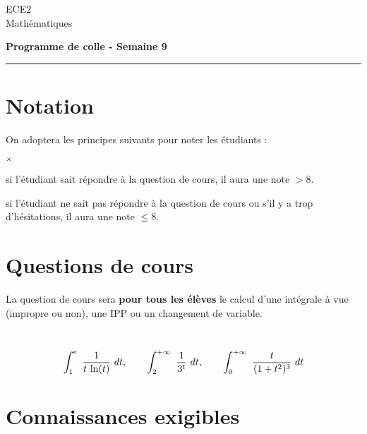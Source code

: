 \documentclass[11pt]{article}%
\begin{document}
\begin{flushleft}
ECE2 \\
Mathématiques
\end{flushleft}


\vspace{0.1cm}

\begin{center}
\textbf{\Large{Programme de colle - Semaine 9}}
\end{center}

\hrule

\vspace*{0,2cm}

\section*{Notation}

\noindent
On adoptera les principes suivants pour noter les étudiants :
\begin{noliste}{$\scriptstyle \times$}
\item si l'étudiant sait répondre à la question de cours, il 
aura une note $>8$.
\item si l'étudiant ne sait pas répondre à la question de 
cours ou s'il y a trop d'hésitations, il aura une note $\leq 8$.
\end{noliste}

\section*{Questions de cours}


\noindent
La question de cours sera {\bf pour tous les élèves} le calcul d'une 
intégrale à vue (impropre ou non), une IPP ou un changement de variable.

\begin{examples}~
 \[
  \displaystyle \int_{1}^{\text{e}}\  \dfrac{1}{t\, \ln(t)} \ dt, \qquad
  \displaystyle \int_{2}^{+\infty}\  \dfrac{1}{3^t} \ dt, \qquad
  \displaystyle \int_{0}^{+\infty}\  \dfrac{t}{(1+t^2)^3} \ dt
 \]
\end{examples}


\section*{Connaissances exigibles}
\end{document}
